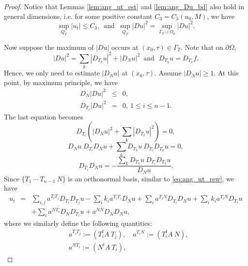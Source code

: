 \documentclass[12pt]{article}
\numberwithin{equation}{section}
\theoremstyle{plain}
\theoremstyle{definition}
\theoremstyle{remark}
\begin{document}
\begin{proof} 
Notice that Lemmas \ref{lem:ang_ut_est} and \ref{lem:ang_Du_bd} also hold in general dimensions, i.e. for some positive constant $C_3=C_3(u_0, M)$, we have
\begin{equation}
\sup_{Q_T} |u_t| \leq C_3,\,\,\,\text{and}\,\,\,
\sup_{Q_T} |Du|^2=\sup_{\Gamma_T \cup \Omega_0} |Du|^2.
\end{equation}


Now suppose the maximum of $|Du|$ occurs at $(x_0, \tau)\in \Gamma_T$. Note that on $\partial \Omega$,
\begin{equation*}
    |Du|^2=\sum_k |D_{T_k} u|^2 + |D_N u|^2
\,\,\,\text{and}\ \ \ 
D_{T_k} u = D_{T_k} f.
\end{equation*}
Hence, we only need to estimate $|D_N u|$ at $(x_0, \tau)$. Assume $|D_N u|\geq 1$. At this point, by maximum principle, we have
\begin{eqnarray} \label{eq:ell_max_norm}
    D_N |Du|^2 &\leq& 0,\\
\label{eq:ell_max_tan}
    D_{T_i} |Du|^2 &=& 0,\ 1\leq i \leq n-1.
\end{eqnarray}
The last equation becomes
\begin{equation*}
    D_{T_i} \left( |D_N u|^2 + \sum_k |D_{T_k} u|^2 \right)=0,
\end{equation*}
\begin{equation*}
    D_N u \ D_{T_i} D_N u + \sum_k D_{T_k} u \ D_{T_i} D_{T_k} u = 0,
\end{equation*}
\begin{equation}
    D_{T_i} D_N u = -\frac{\sum_k D_{T_k} u \ D_{T_i} D_{T_k} u}{D_N u}.
\end{equation}
Since $\{T_1\  \cdots\  T_{n-1}\  N\}$ is an orthonormal basis, similar to \eqref{eq:ang_ut_rew}, we have
\begin{eqnarray} 
u_t  & = & \sum_{i,j} a^{T_i T_j} D_{T_i} D_{T_j} u  -\sum_i k_i a^{T_i T_i} D_N u + \sum_i a^{T_i N} D_{T_i} D_N u + \sum_i k_i a^{T_i N} D_{T_i} u \nonumber\\
& & + \sum_i a^{N T_i} D_N D_{T_i} u + a^{NN} D_N D_N u, 
\label{eq:4.12}
\end{eqnarray}
where we similarly define the following quantities:
\begin{equation}\label{eq:diri_aTN_def}
\begin{split}
    & a^{T_i T_j}  := \left( T_i^t A \ T_j \right),\quad
a^{T_i N}  := \left( T_i^t A \ N \right), \\
& a^{N T_i}  := \left( N^t A \ T_i \right),\quad

\end{split}
\end{equation}
\end{proof}
\end{document}
